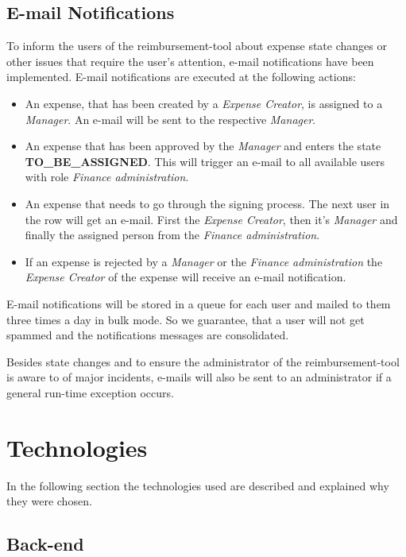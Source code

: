 \subsection{E-mail Notifications}
To inform the users of the reimbursement-tool about expense state changes or other issues that require the user's attention, e-mail notifications have been implemented. E-mail notifications are executed at the following actions:
\begin{itemize}
	\item An expense, that has been created by a \textit{Expense Creator}, is assigned to a \textit{Manager}. An e-mail will be sent to the respective \textit{Manager}.
	\item An expense that has been approved by the \textit{Manager} and enters the state \newline \textbf{TO\_BE\_ASSIGNED}. This will trigger an e-mail to all available users with role \textit{Finance administration}.
	\item An expense that needs to go through the signing process. The next user in the row will get an e-mail. First the \textit{Expense Creator}, then it's \textit{Manager} and finally the assigned person from the \textit{Finance administration}.
	\item If an expense is rejected by a \textit{Manager} or the \textit{Finance administration} the \textit{Expense Creator} of the expense will receive an e-mail notification.
\end{itemize}

E-mail notifications will be stored in a queue for each user and mailed to them three times a day in bulk mode. So we guarantee, that a user will not get spammed and the notifications messages are consolidated.

Besides state changes and to ensure the administrator of the reimbursement-tool is aware to of major incidents, e-mails will also be sent to an administrator if a general run-time exception occurs. 


\section{Technologies}

In the following section the technologies used are described and explained why they were chosen.

\subsection{Back-end}

